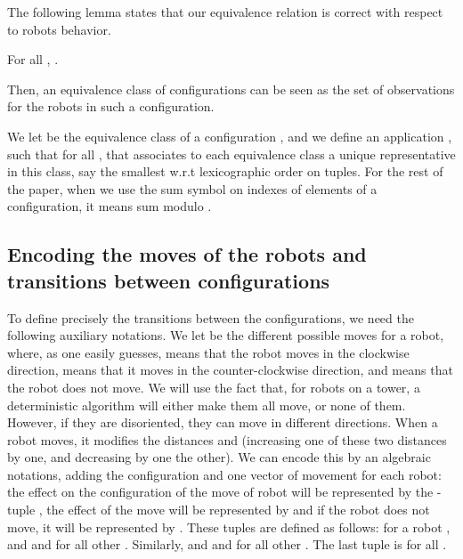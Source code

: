 \documentclass[envcountsame]{llncs} \usepackage[english]{babel}
\begin{document}
The following lemma states that our equivalence relation is correct with respect to robots behavior.
\begin{lemma}\label{lem:equivalence-classes}
For all , .
\end{lemma}

Then, an equivalence class of configurations can be seen as the set of observations for the robots in such a configuration.

We let  be the equivalence class of a configuration , and
we define an application , such that 
  for all , that associates to each 
 equivalence class a unique representative in this class, say the smallest w.r.t lexicographic order on tuples. 
For the rest of the paper, when we use the sum symbol on indexes of elements of a configuration, it means sum modulo .

\subsection{Encoding the moves of the robots and transitions between configurations}\label{subsec:moves}
To define precisely the transitions between the configurations, we need the following auxiliary notations.
 We  let  be the different possible moves for a robot, where, as one easily 
 guesses,  means that the robot moves in the clockwise direction,  means that it moves in 
 the counter-clockwise direction, and  means that the robot does not move.
 We will use the fact that,
 for robots on a tower, a deterministic algorithm will either make them all move, or none of them. However, if they are disoriented, they
 can move in different directions.
 When a robot  moves, it modifies the distances  and  (increasing one of these two distances by one, and
 decreasing by one the other). We can encode this by an algebraic notations, adding the configuration and one
 vector of movement for each robot: the effect on the configuration of the move  of robot  will be represented 
by the -tuple , the effect of the move  will be represented by  
and if the robot does not move, it will be represented by . 
These tuples are defined as follows: for a robot ,
 and  and  for all other . Similarly,
 and  and  for all other . The last tuple is  for all 
.
\end{document}
